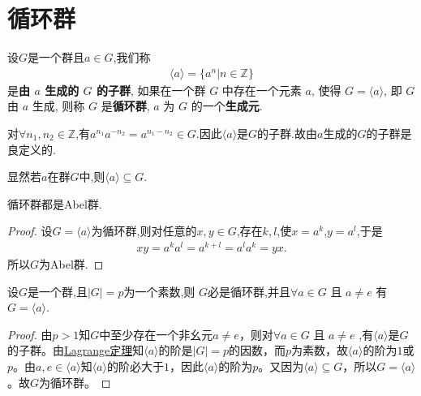 \documentclass[../../main.tex]{subfiles}%
\begin{document}
\section{循环群}

\begin{definition}[循环群]
设$G$是一个群且$a\in G$,我们称
\begin{align*}
\langle a \rangle = \{a^n|n \in \mathbb{Z}\}
\end{align*}
是\textbf{由 \( a \) 生成的 \( G \) 的子群}, 如果在一个群 \( G \) 中存在一个元素 \( a \), 使得 \( G = \langle a \rangle \), 即 \( G \) 由 \( a \) 生成, 则称 \( G \) 是\textbf{循环群}, \( a \) 为 \( G \) 的一个\textbf{生成元}.
\end{definition}
\begin{remark}
对$\forall n_1,n_2\in \mathbb{Z}$,有$a^{n_1}a^{-n_2}=a^{n_1-n_2}\in G$.因此$\langle a \rangle$是$G$的子群.故由$a$生成的$G$的子群是良定义的.
\end{remark}
\begin{remark}
显然若$a$在群$G$中,则$\langle a \rangle\subseteq G.$
\end{remark}

\begin{proposition}[循环群都是Abel群]
循环群都是Abel群.
\end{proposition}
\begin{proof}

设$G=\langle a \rangle$为循环群,则对任意的$x,y \in G$,存在$k,l$,使$x=a^k$,$y=a^l$,于是
\begin{align*}
xy = a^k a^l = a^{k+l} = a^l a^k = yx.
\end{align*}
所以$G$为Abel群.

\end{proof}

\begin{proposition}[素数阶群必为循环群]\label{proposition:素数阶群必为循环群}
设$G$是一个群,且$|G|=p$为一个素数,则
$G$必是循环群,并且\( \forall a \in G \) 且 \( a \neq e \) 有 \( G = \langle a \rangle \). 
\end{proposition}
\begin{proof}

由$p>1$知$G$中至少存在一个非幺元$a\ne e$，则对\( \forall a \in G \) 且 \( a \neq e \) ,有$\langle a\rangle$是$G$的子群。由\hyperref[theorem:抽象代数--Lagrange定理]{Lagrange定理}知$\langle a\rangle$的阶是$|G|=p$的因数，而$p$为素数，故$\langle a\rangle$的阶为$1$或$p$。由$a,e\in\langle a\rangle$知$\langle a\rangle$的阶必大于$1$，因此$\langle a\rangle$的阶为$p$。又因为$\langle a\rangle\subseteq G$，所以$G=\langle a\rangle$。故$G$为循环群。

\end{proof}
\end{document}
